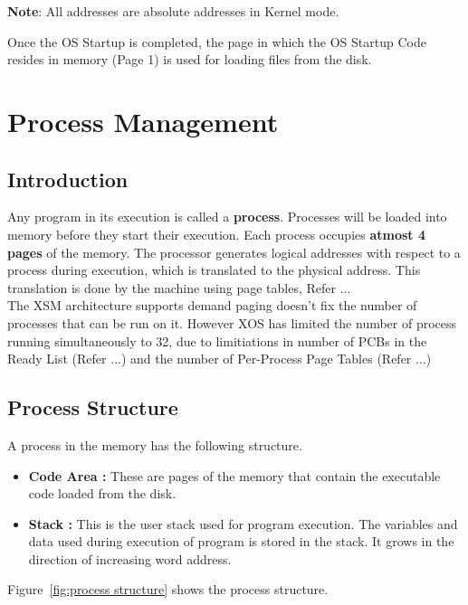 \documentclass[10pt]{report}
\begin{document}
\textbf{Note}: All addresses are absolute addresses in Kernel mode. 

Once the OS Startup is completed, the page in which the OS Startup Code resides in memory (Page 1) is used for loading files from the disk.


\chapter{Process Management}
\label{chp:process}

\section{Introduction}
Any program in its execution is called a \textbf{process}. Processes will be loaded into memory before they start their execution. Each process occupies \textbf{atmost 4 pages} of the memory. The processor generates logical addresses with respect to a process during execution, which is translated to the physical address. This translation is done by the machine using page tables, Refer ... \\ 

The XSM architecture supports demand paging doesn't fix the number of processes that can be run on it. However XOS has limited the number of process running simultaneously to 32, due to limitiations in number of PCBs in the Ready List (Refer ...) and the number of Per-Process Page Tables (Refer ...)\\




\section{Process Structure}
A process in the memory has the following structure.
\begin{itemize}
	\item \textbf{Code Area :}  These are pages of the memory that contain the executable code loaded from the disk. 
	\item \textbf{Stack :} This is the user stack used for program execution. The variables and data used during execution of program is stored in the stack. It grows in the direction of increasing word address.
\end{itemize}

Figure~\ref{fig:process structure} shows the process structure. \\
\end{document}
